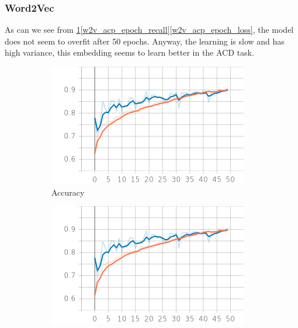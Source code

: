 \documentclass{article}
\begin{document}
            \subsubsection{Word2Vec}
            As can we see from \ref{w2v_acp_epoch_accuracy}\ref{w2v_acp_epoch_recall}\ref{w2v_acp_epoch_loss}, the model does not seem to overfit after 50 epochs.
            Anyway, the learning is slow and has high variance, this embedding seems to learn better in the ACD task.
            \begin{figure}
		    \centering
		        \begin{subfigure}{.33\textwidth}
  		            \centering
 		            \includegraphics[width=\textwidth]{imgs/plots/w2v_acp_epoch_accuracy.png}
  		            \caption{Accuracy}
  		            \label{w2v_acp_epoch_accuracy}
		        \end{subfigure}%
                \begin{subfigure}{.33\textwidth}
 		            \centering
 		            \includegraphics[width=\textwidth]{imgs/plots/w2v_acp_epoch_recall.png}

\end{subfigure}
\end{figure}
\end{document}
